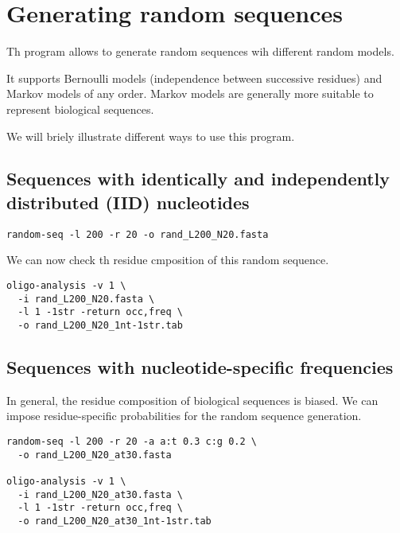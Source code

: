 \section{Generating random sequences}

Th program  allows to generate random sequences
wih different random models.

It supports Bernoulli models (independence between successive
residues) and Markov models of any order. Markov models are generally
more suitable to represent biological sequences. 


We will briely illustrate different ways to use this program. 

\subsection{Sequences with identically and independently distributed (IID) nucleotides}

\begin{small}
\begin{verbatim}
random-seq -l 200 -r 20 -o rand_L200_N20.fasta
\end{verbatim}
\end{small}

We can now check th residue cmposition of this random sequence.

\begin{small}
\begin{verbatim}
oligo-analysis -v 1 \
  -i rand_L200_N20.fasta \
  -l 1 -1str -return occ,freq \
  -o rand_L200_N20_1nt-1str.tab
\end{verbatim}
\end{small}

\subsection{Sequences with nucleotide-specific frequencies}

In general, the residue composition of biological sequences is
biased. We can impose residue-specific probabilities for the random
sequence generation.

\begin{small}
\begin{verbatim}
random-seq -l 200 -r 20 -a a:t 0.3 c:g 0.2 \
  -o rand_L200_N20_at30.fasta 

oligo-analysis -v 1 \
  -i rand_L200_N20_at30.fasta \
  -l 1 -1str -return occ,freq \
  -o rand_L200_N20_at30_1nt-1str.tab
\end{verbatim}
\end{small}


